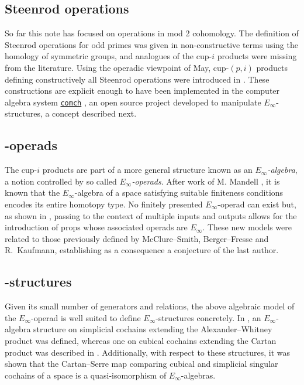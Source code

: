 \subsection{Steenrod operations} \label{ss:may steenrod}

So far this note has focused on operations in mod 2 cohomology.
The definition of Steenrod operations for odd primes was given in non-constructive terms using the homology of symmetric groups, and analogues of the cup-$i$ products were missing from the literature.
Using the operadic viewpoint of May, cup-$(p,i)$ products defining constructively all Steenrod operations
were introduced in \cite{medina2021may_st}.
These constructions are explicit enough to have been implemented in the computer algebra system \href{https://comch.readthedocs.io/en/latest/}{\texttt{comch}} \cite{medina2021comch}, an open source project developed to manipulate $E_\infty$-structures, a concept described next.

\subsection{\pdfEinfty-operads}

The cup-$i$ products are part of a more general structure known as an \textit{$E_\infty$-algebra}, a notion controlled by so called \textit{$E_\infty$-operads}.
After work of M. Mandell \cite{mandell2006cochains}, it is known that the $E_\infty$-algebra of a space satisfying suitable finiteness conditions encodes its entire homotopy type.
No finitely presented $E_\infty$-operad can exist but, as shown in \cite{medina2020prop1,medina2021prop2}, passing to the context of multiple inputs and outputs allows for the introduction of props whose associated operads are $E_\infty$.
These new models were related to those previously defined by McClure--Smith, Berger--Fresse and R.~Kaufmann, establishing as a consequence a conjecture of the last author.

\subsection{\pdfEinfty-structures} \label{ss:e-infty structures}

Given its small number of generators and relations, the above algebraic model of the $E_\infty$-operad is well suited to define $E_{\infty}$-structures concretely.
In \cite{medina2020prop1}, an $E_\infty$-algebra structure on simplicial cochains extending the Alexander--Whitney product was defined, whereas one on cubical cochains extending the Cartan product was described in \cite{medina2022cube_einfty}.
Additionally, with respect to these structures, it was shown that the Cartan--Serre map comparing cubical and simplicial singular cochains of a space is a quasi-isomorphism of $E_\infty$-algebras.

